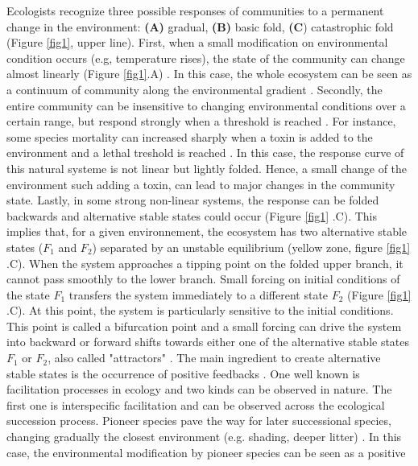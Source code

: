 Ecologists recognize three possible responses of communities to a permanent
change in the environment: \textbf{(A)} gradual, \textbf{(B)} basic fold,
\textbf{(C}) catastrophic fold \cite{Scheffer2001} (Figure \ref{fig1}, upper
line). First, when a small modification on environmental condition occurs
(e.g, temperature rises), the state of the community can change almost
linearly (Figure \ref{fig1}.A) \cite{Scheffer2001,Scheffer2009}. In this case,
the whole ecosystem can be seen as a continuum of community along the
environmental gradient \cite{Scheffer2001,Scheffer2009,scheffer2009critical}.
Secondly, the entire community can be insensitive to changing environmental
conditions over a certain range, but respond strongly when a threshold is
reached \cite{scheffer2009critical}. For instance, some species mortality can
increased sharply when a toxin is added to the environment and a lethal
treshold is reached \cite{scheffer2009critical}. In this case, the response
curve of this natural systeme is not linear but lightly folded. Hence, a small
change of the environment such adding a toxin, can lead to major changes in
the  community state. Lastly, in some strong non-linear systems, the response
can be folded backwards and alternative stable states could occur (Figure
\ref{fig1} .C). This implies that, for a given environnement, the ecosystem
has two alternative stable states ($F_1$ and $F_2$) separated by an unstable
equilibrium (yellow zone, figure \ref{fig1} .C). When the system approaches a
tipping point on the folded upper branch, it cannot pass smoothly to the lower
branch. Small forcing on initial conditions of the state $F_1$ transfers the
system immediately to a different state $F_2$ (Figure \ref{fig1} .C). At this
point, the system is particularly sensitive to the initial conditions. This
point is called a bifurcation point and a small forcing can drive the system
into backward or forward shifts towards either one of the alternative stable
states $F_1$ or $F_2$, also called "attractors" \cite{scheffer2009critical}.
The main ingredient to create alternative stable states is the occurrence of
positive feedbacks \cite{scheffer2009critical,Schroder2005}. One well known is
facilitation processes in ecology and two kinds can be observed in nature. The
first one is interspecific facilitation and can be observed across the ecological
succession process. Pioneer species pave the way for later successional
species, changing gradually the closest environment (e.g. shading, deeper
litter) \cite{scheffer2009critical, Levine2006}. In this case, the
environmental modification by pioneer species can be seen as a positive
